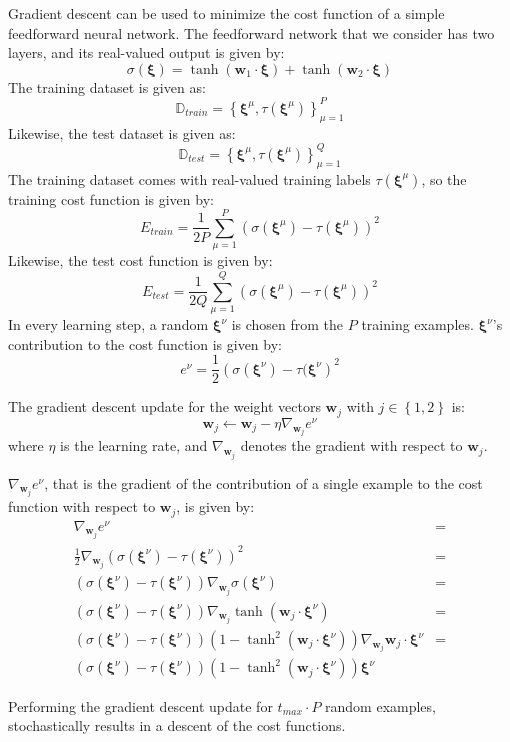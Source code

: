 Gradient descent can be used to minimize the cost function of a simple feedforward neural network.
The feedforward network that we consider has two layers, and its real-valued output is given by:
\[
	\sigma(\pmb{\xi}) = 
	\tanh(\mathbf{w}_1\cdot \pmb{\xi}) + \tanh(\mathbf{w}_2\cdot \pmb{\xi})
\]
The training dataset is given as:
\[
\mathbb{D}_{train} =
	\left\{
		\pmb{\xi}^\mu, \tau(\pmb{\xi}^\mu)
	\right\}_{\mu=1}^{P}
\]
Likewise, the test dataset is given as:
\[
\mathbb{D}_{test} =
	\left\{
		\pmb{\xi}^\mu, \tau(\pmb{\xi}^\mu)
	\right\}_{\mu=1}^{Q}
\]
The training dataset comes with real-valued training labels \(\tau(\pmb{\xi}^\mu)\), so the training cost function is given by:
\[
	E_{train} = 
	\frac{1}{2P}
	\sum_{\mu=1}^P(\sigma(\pmb{\xi}^\mu) - \tau(\pmb{\xi}^\mu))^2
\]
Likewise, the test cost function is given by:
\[
	E_{test} = 
	\frac{1}{2Q}
	\sum_{\mu=1}^Q(\sigma(\pmb{\xi}^\mu) - \tau(\pmb{\xi}^\mu))^2
\]
In every learning step, a random \(\pmb{\xi}^\nu\) is chosen from the \(P\) training examples.
\(\pmb{\xi}^\nu\)'s contribution to the cost function is given by:
\[
	e^\nu = 
	\frac{1}{2}\left(
		\sigma(\pmb{\xi}^\nu) - \tau(\pmb{\xi}^\nu
	\right)^2
\]

The gradient descent update for the weight vectors \(\mathbf{w}_j\) with \(j \in \left\{1, 2\right\}\) is:
\[
	\mathbf{w}_j \leftarrow \mathbf{w}_j - \eta \nabla_{\mathbf{w}_j}e^\nu
\]
where \(\eta\) is the learning rate, and \(\nabla_{\mathbf{w}_j}\) denotes the gradient with respect to \(\mathbf{w}_j\).

\(\nabla_{\mathbf{w}_j}e^\nu\), that is the gradient of the contribution of a single example to the cost function with respect to \(\mathbf{w}_j\), is given by:
\begin{align*}
	\nabla_{\mathbf{w}_j}e^\nu
	&= \\
	\frac{1}{2} \nabla_{\mathbf{w}_j} \left( 
		\sigma(\pmb{\xi}^\nu) - \tau(\pmb{\xi}^\nu)
	\right)^2
	&= \\
	(\sigma(\pmb{\xi}^\nu) - \tau(\pmb{\xi}^\nu))
	\nabla_{\mathbf{w}_j}
	\sigma(\pmb{\xi}^\nu)
	&= \\
	(\sigma(\pmb{\xi}^\nu) - \tau(\pmb{\xi}^\nu))
	\nabla_{\mathbf{w}_j}
	\tanh(\mathbf{w}_j\cdot\pmb{\xi}^\nu)
	&= \\
	(\sigma(\pmb{\xi}^\nu) - \tau(\pmb{\xi}^\nu))
	(1 - \tanh^2(\mathbf{w}_j\cdot\pmb{\xi}^\nu))
	\nabla_{\mathbf{w}_j}
	\mathbf{w}_j\cdot\pmb{\xi}^\nu
	&= \\
	(\sigma(\pmb{\xi}^\nu) - \tau(\pmb{\xi}^\nu))
	(1 - \tanh^2(\mathbf{w}_j\cdot\pmb{\xi}^\nu))
	\pmb{\xi}^\nu
\end{align*}

Performing the gradient descent update for \(t_{max} \cdot P\) random examples, stochastically results in a descent of the cost functions.

\[\]